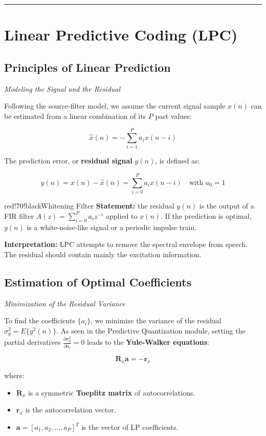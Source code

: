 \bigskip\hrule\bigskip

\section{Linear Predictive Coding (LPC)}

\subsection{Principles of Linear Prediction}

\textit{Modeling the Signal and the Residual}

Following the source-filter model, we assume the current signal sample $x(n)$ can be estimated from a linear combination of its $P$ past values:

\[
\hat{x}(n) = -\sum_{i=1}^{P} a_i x(n-i)
\]

The prediction error, or \textbf{residual signal} $y(n)$, is defined as:

\[
y(n) = x(n) - \hat{x}(n) = \sum_{i=0}^{P} a_i x(n-i) \quad \text{with } a_0 = 1
\]

\begin{calloutbox}{red!70!black}{Whitening Filter}
\textbf{Statement:} the residual $y(n)$ is the output of a FIR filter $A(z) = \sum_{i=0}^{P} a_i z^{-i}$ applied to $x(n)$. If the prediction is optimal, $y(n)$ is a white-noise-like signal or a periodic impulse train.

\textbf{Interpretation:} LPC attempts to remove the spectral envelope from speech. The residual should contain mainly the excitation information.
\end{calloutbox}

\subsection{Estimation of Optimal Coefficients}

\textit{Minimization of the Residual Variance}

To find the coefficients $\{a_i\}$, we minimize the variance of the residual $\sigma_y^2 = E\{y^2(n)\}$. As seen in the Predictive Quantization module, setting the partial derivatives $\frac{\partial \sigma_y^2}{\partial a_i} = 0$ leads to the \textbf{Yule-Walker equations}:

\[
\mathbf{R}_x \mathbf{a} = -\mathbf{r}_x
\]

where:

\begin{itemize}
\item $\mathbf{R}_x$ is a symmetric \textbf{Toeplitz matrix} of autocorrelations.
\item $\mathbf{r}_x$ is the autocorrelation vector.
\item $\mathbf{a} = [a_1, a_2, \ldots, a_P]^T$ is the vector of LP coefficients.
\end{itemize}

